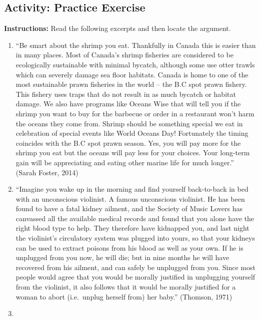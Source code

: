\documentclass[
]{book}
\begin{document}
\hypertarget{activity-practice-exercise}{%
\subsection*{Activity: Practice Exercise}\label{activity-practice-exercise}}

\textbf{Instructions:} Read the following excerpts and then locate the argument.

\begin{enumerate}
\def\labelenumi{\arabic{enumi}.}
\item
  ``Be smart about the shrimp you eat. Thankfully in Canada this is easier than in many places. Most of Canada's shrimp fisheries are considered to be ecologically sustainable with minimal bycatch, although some use otter trawls which can severely damage sea floor habitats. Canada is home to one of the most sustainable prawn fisheries in the world -- the B.C spot prawn fishery. This fishery uses traps that do not result in as much bycatch or habitat damage. We also have programs like Oceans Wise that will tell you if the shrimp you want to buy for the barbecue or order in a restaurant won't harm the oceans they come from. Shrimp should be something special we eat in celebration of special events like World Oceans Day! Fortunately the timing coincides with the B.C spot prawn season. Yes, you will pay more for the shrimp you eat but the oceans will pay less for your choices. Your long-term gain will be appreciating and eating other marine life for much longer.'' (Sarah Foster, 2014)
\item
  ``Imagine you wake up in the morning and find yourself back-to-back in bed with an unconscious violinist. A famous unconscious violinist. He has been found to have a fatal kidney ailment, and the Society of Music Lovers has canvassed all the available medical records and found that you alone have the right blood type to help. They therefore have kidnapped you, and last night the violinist's circulatory system was plugged into yours, so that your kidneys can be used to extract poisons from his blood as well as your own. If he is unplugged from you now, he will die; but in nine months he will have recovered from his ailment, and can safely be unplugged from you. Since most people would agree that you would be morally justified in unplugging yourself from the violinist, it also follows that it would be morally justified for a woman to abort (i.e.~unplug herself from) her baby.'' (Thomson, 1971)
\item

\end{enumerate}
\end{document}
